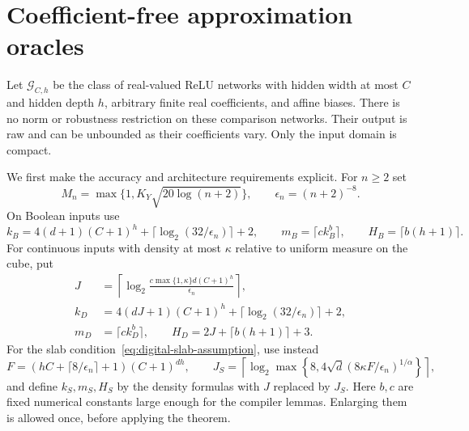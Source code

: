 \section{Coefficient-free approximation oracles}
\label{sec:coefficient-free-oracle}
Let $\mathcal G_{C,h}$ be the class of real-valued ReLU networks with
hidden width at most $C$ and hidden depth $h$, arbitrary finite real
coefficients, and affine biases.  There is no norm or robustness restriction
on these comparison networks.  Their output is raw and can be unbounded
as their coefficients vary.  Only the input domain is compact.

We first make the accuracy and architecture requirements explicit.  For
$n\ge2$ set
\[
 M_n=\max\{1,K_Y\sqrt{20\log(n+2)}\},\qquad \epsilon_n=(n+2)^{-8}.
\]
On Boolean inputs use
\[
 k_B=4(d+1)(C+1)^h+\lceil\log_2(32/\epsilon_n)\rceil+2,
 \qquad m_B=\lceil c k_B^b\rceil,
 \qquad H_B=\lceil b(h+1)\rceil.
\]
For continuous inputs with density at most $\kappa$ relative to uniform
measure on the cube, put
\begin{align*}
 J&=\left\lceil\log_2\frac{c\max\{1,\kappa\}d(C+1)^h}{\epsilon_n}\right\rceil,\\
 k_D&=4(dJ+1)(C+1)^h+\lceil\log_2(32/\epsilon_n)\rceil+2,\\
 m_D&=\lceil c k_D^b\rceil,\qquad H_D=2J+\lceil b(h+1)\rceil+3.
\end{align*}
For the slab condition~\eqref{eq:digital-slab-assumption}, use instead
\[
 F=(hC+\lceil8/\epsilon_n\rceil+1)(C+1)^{dh},\qquad
 J_S=\left\lceil\log_2\max\left\{8,
 4\sqrt d(8\kappa F/\epsilon_n)^{1/\alpha}\right\}\right\rceil,
\]
and define $k_S,m_S,H_S$ by the density formulas with $J$ replaced by $J_S$.
Here $b,c$ are fixed numerical constants large enough for the compiler
lemmas.  Enlarging them is allowed once, before applying the theorem.

